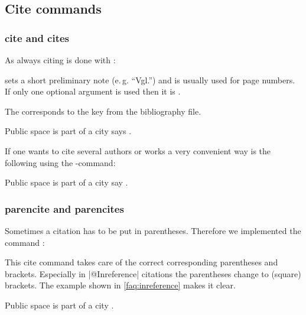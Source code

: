 \documentclass[a4paper,
10pt,
greek,
french,
spanish,
italian,
ngerman,
english
]{ltxdoc}
\begin{document}
\subsection{Cite commands}
\label{cite-commands}
\subsubsection{cite and cites}
\DescribeMacro{\cite}
As always citing is done with :

 sets a short preliminary note (e.\,g. \enquote{Vgl.}) and  is usually used for page numbers.
If only one optional argument is used then it is .
The  corresponds to the key from the bibliography file.

\begin{example}
Public space is part of a city says \cite{Osland2016}.
\end{example}

\DescribeMacro{\cites}
If one wants to cite several authors or works a very convenient way is the following using the -command:
\begin{example}
Public space is part of a city say \cites(cf.)(){Osland2016}{Evangelidis2014}.
\end{example}
 
 \subsubsection{parencite and parencites}
\DescribeMacro{\parencite}
Sometimes a citation has to be put in parentheses. 
Therefore we implemented the command :
This cite command takes care of the correct corresponding parentheses and brackets.
Especially in |@Inreference| citations the parentheses  change to (square) brackets.
The example shown in \cref{faq:inreference} makes it clear.
\begin{example}
Public space is part of a city \parencite{Osland2016}.
\end{example}
\end{document}
